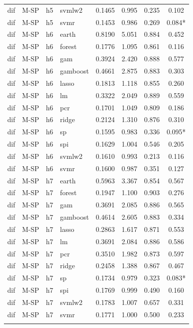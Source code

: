 \begin{ThreePartTable}
\begin{longtable}[t]{llclcccc}
dif & M-SP & h5 & svmlw2 & 0.1465 & 0.995 & 0.235 & 0.102\\
dif & M-SP & h5 & svmr & 0.1453 & 0.986 & 0.269 & 0.084*\\
\addlinespace
dif & M-SP & h6 & earth & 0.8190 & 5.051 & 0.884 & 0.452\\
dif & M-SP & h6 & forest & 0.1776 & 1.095 & 0.861 & 0.116\\
dif & M-SP & h6 & gam & 0.3924 & 2.420 & 0.888 & 0.577\\
dif & M-SP & h6 & gamboost & 0.4661 & 2.875 & 0.883 & 0.303\\
dif & M-SP & h6 & lasso & 0.1813 & 1.118 & 0.855 & 0.260\\
dif & M-SP & h6 & lm & 0.3322 & 2.049 & 0.889 & 0.559\\
dif & M-SP & h6 & pcr & 0.1701 & 1.049 & 0.809 & 0.186\\
dif & M-SP & h6 & ridge & 0.2124 & 1.310 & 0.876 & 0.310\\
dif & M-SP & h6 & sp & 0.1595 & 0.983 & 0.336 & 0.095*\\
dif & M-SP & h6 & spi & 0.1629 & 1.004 & 0.546 & 0.205\\
dif & M-SP & h6 & svmlw2 & 0.1610 & 0.993 & 0.213 & 0.116\\
dif & M-SP & h6 & svmr & 0.1600 & 0.987 & 0.351 & 0.127\\
\addlinespace
dif & M-SP & h7 & earth & 0.5963 & 3.367 & 0.854 & 0.567\\
dif & M-SP & h7 & forest & 0.1947 & 1.100 & 0.903 & 0.276\\
dif & M-SP & h7 & gam & 0.3691 & 2.085 & 0.886 & 0.565\\
dif & M-SP & h7 & gamboost & 0.4614 & 2.605 & 0.883 & 0.334\\
dif & M-SP & h7 & lasso & 0.2863 & 1.617 & 0.871 & 0.553\\
dif & M-SP & h7 & lm & 0.3691 & 2.084 & 0.886 & 0.586\\
dif & M-SP & h7 & pcr & 0.3510 & 1.982 & 0.873 & 0.597\\
dif & M-SP & h7 & ridge & 0.2458 & 1.388 & 0.867 & 0.467\\
dif & M-SP & h7 & sp & 0.1734 & 0.979 & 0.323 & 0.083*\\
dif & M-SP & h7 & spi & 0.1769 & 0.999 & 0.490 & 0.160\\
dif & M-SP & h7 & svmlw2 & 0.1783 & 1.007 & 0.657 & 0.331\\
dif & M-SP & h7 & svmr & 0.1771 & 1.000 & 0.500 & 0.233\\
\addlinespace

\end{longtable}
\end{ThreePartTable}
